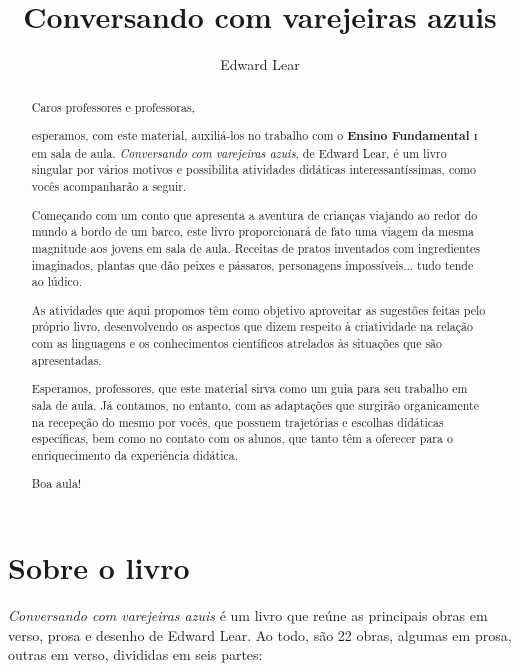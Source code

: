 \documentclass[11pt]{extarticle}
\newcommand{\AutorLivro}{Edward Lear}
\newcommand{\TituloLivro}{Conversando com varejeiras azuis}
\newcommand{\colaborador}{Renier Silva}
\begin{document}
\title{\TituloLivro}
\author{\AutorLivro}
\def\authornotes{\colaborador}

\date{}
\maketitle

\tableofcontents


\begin{abstract}

Caros professores e professoras,

esperamos, com este material,
auxiliá-los no trabalho com o \textbf{Ensino Fundamental \textsc{i}} em 
sala de aula. \textit{Conversando com varejeiras azuis}, de Edward Lear, é um livro singular
por vários motivos e possibilita atividades didáticas interessantíssimas,
como vocês acompanharão a seguir.

Começando com um conto que apresenta a aventura de crianças viajando 
ao redor do mundo a bordo de um barco, este livro proporcionará de fato
uma viagem da mesma magnitude aos jovens em sala de aula. 
Receitas de pratos inventados com ingredientes imaginados, 
plantas que dão peixes e pássaros, personagens impossíveis...
tudo tende ao lúdico. 

As atividades que aqui propomos têm como objetivo aproveitar
as sugestões feitas pelo próprio livro, desenvolvendo 
os aspectos que dizem respeito à criatividade na relação
com as linguagens e os conhecimentos científicos atrelados 
às situações que são apresentadas. 

Esperamos, professores, que este material sirva como um guia 
para seu trabalho em sala de aula. Já contamos, no entanto, com as adaptações
que surgirão organicamente na recepeção do mesmo por vocês, que possuem 
trajetórias e escolhas didáticas específicas, bem como no contato com os 
alunos, que tanto têm a oferecer para o enriquecimento da experiência didática.

Boa aula!

\end{abstract}

\section{Sobre o livro}

\textit{Conversando com varejeiras azuis} é um livro que reúne as principais
obras em verso, prosa e desenho de Edward Lear.
Ao todo, são 22 obras, algumas em prosa, outras em verso, divididas
em seis partes: 
\end{document}
